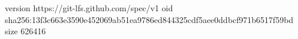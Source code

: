 version https://git-lfs.github.com/spec/v1
oid sha256:13f3c663e3590e452069ab51ea9786ed844325cdf5aee0ddbcf971b6517f59bd
size 626416
